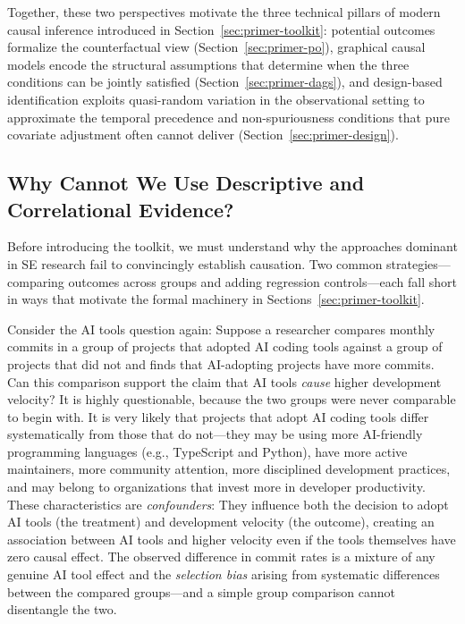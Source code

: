 Together, these two perspectives motivate the three technical pillars of modern causal inference introduced in Section~\ref{sec:primer-toolkit}: potential outcomes formalize the counterfactual view (Section~\ref{sec:primer-po}), graphical causal models encode the structural assumptions that determine when the three conditions can be jointly satisfied (Section~\ref{sec:primer-dags}), and design-based identification exploits quasi-random variation in the observational setting to approximate the temporal precedence and non-spuriousness conditions that pure covariate adjustment often cannot deliver (Section~\ref{sec:primer-design}).

\subsection{Why Cannot We Use Descriptive and Correlational Evidence?}
\label{sec:primer-naive}

Before introducing the toolkit, we must understand why the approaches dominant in SE research fail to convincingly establish causation.
Two common strategies---comparing outcomes across groups and adding regression controls---each fall short in ways that motivate the formal machinery in Sections~\ref{sec:primer-toolkit}.

Consider the AI tools question again: Suppose a researcher compares monthly commits in a group of projects that adopted AI coding tools against a group of projects that did not and finds that AI-adopting projects have more commits.
Can this comparison support the claim that AI tools \emph{cause} higher development velocity?
It is highly questionable, because the two groups were never comparable to begin with.
It is very likely that projects that adopt AI coding tools differ systematically from those that do not---they may be using more AI-friendly programming languages (e.g., TypeScript and Python), have more active maintainers, more community attention, more disciplined development practices, and may belong to organizations that invest more in developer productivity.
These characteristics are \emph{confounders}: They influence both the decision to adopt AI tools (the treatment) and development velocity (the outcome), creating an association between AI tools and higher velocity even if the tools themselves have zero causal effect.
The observed difference in commit rates is a mixture of any genuine AI tool effect and the \emph{selection bias} arising from systematic differences between the compared groups---and a simple group comparison cannot disentangle the two.

